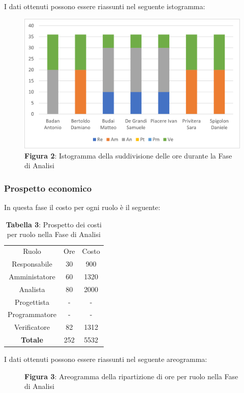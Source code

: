 I dati ottenuti possono essere riassunti nel seguente istogramma:
\begin{figure}[H]
	\centering
	\includegraphics[width=0.7\linewidth]{res/images/Figura2.png}
	\caption*{\textbf{Figura 2}: Istogramma della suddivisione delle ore durante la Fase di Analisi}
	\label{fig:Figura2}
\end{figure}

\subsubsection{Prospetto economico}
In questa fase il costo per ogni ruolo è il seguente:

\begin{table}[H]
	\centering
	\renewcommand{\arraystretch}{1.5}
	\begin{tabular}{|c|c|c|}
		\hline
		\rowcolor{lighter-grayer}
		Ruolo & Ore & Costo\\
Responsabile  & 30  & 900  \\ \hline
Amministatore & 60  & 1320 \\ \hline
Analista      & 80  & 2000 \\ \hline
Progettista   & - & - \\ \hline
Programmatore & - & - \\ \hline
Verificatore  & 82  & 1312 \\ \hline
\textbf{Totale}& 252 & 5532 \\ \hline
\end{tabular}
	\caption*{\textbf{Tabella 3}: Prospetto dei costi per ruolo nella Fase di Analisi\\}
\end{table}
I dati ottenuti possono essere riassunti nel seguente areogramma:
\begin{figure}[H]
	\centering
	\caption*{\textbf{Figura 3}:  Areogramma della ripartizione di ore per ruolo nella Fase di Analisi}
	\label{fig:Figura3}
\end{figure}	



